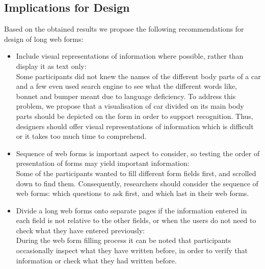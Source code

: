 \documentclass[../main/Replicate.tex]{subfiles}
\begin{document}
	\subsection{Implications for Design}
	Based on the obtained results we propose the following recommendations for design of long web forms:
	\begin{itemize}
		\item Include visual representations of information where possible, rather than display it as text only:\\
		Some participants did not knew the names of the different body parts of a car and a few even used search engine to see what the different words like, bonnet and bumper meant due to language deficiency. 
		To address this problem, we propose that a visualisation of car divided on its main body parts should be depicted on the form in order to support recognition. 
		Thus, designers should offer visual representations of information which is difficult or it takes too much time to comprehend.
		
		\item Sequence of web forms is important aspect to consider, so testing the order of presentation of forms may yield important information:\\
		Some of the participants wanted to fill different form fields first, and scrolled down to find them. 
		Consequently, researchers should consider the sequence of web forms: which questions to ask first, and which last in their web forms.
		
		\item Divide a long web forms onto separate pages if the information entered in each field is not relative to the other fields, or when the users do not need to check what they have entered previously:\\
		During the web form filling process it can be noted that participants occasionally inspect what they have written before, in order to verify that information or check what they had written before. 
	\end{itemize}
	
\end{document}
